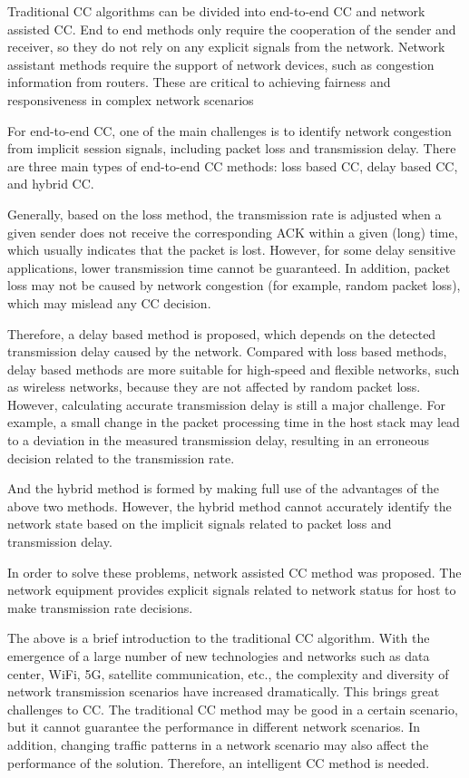 \documentclass[conference]{IEEEtran}
\begin{document}
Traditional CC algorithms can be divided into end-to-end CC and network assisted CC. End to end methods only require the cooperation of the sender and receiver, so they do not rely on any explicit signals from the network. Network assistant methods require the support of network devices, such as congestion information from routers. These are critical to achieving fairness and responsiveness in complex network scenarios

For end-to-end CC, one of the main challenges is to identify network congestion from implicit session signals, including packet loss and transmission delay. There are three main types of end-to-end CC methods: loss based CC, delay based CC, and hybrid CC.

Generally, based on the loss method, the transmission rate is adjusted when a given sender does not receive the corresponding ACK within a given (long) time, which usually indicates that the packet is lost. However, for some delay sensitive applications, lower transmission time cannot be guaranteed. In addition, packet loss may not be caused by network congestion (for example, random packet loss), which may mislead any CC decision.

Therefore, a delay based method is proposed, which depends on the detected transmission delay caused by the network. Compared with loss based methods, delay based methods are more suitable for high-speed and flexible networks, such as wireless networks, because they are not affected by random packet loss. However, calculating accurate transmission delay is still a major challenge. For example, a small change in the packet processing time in the host stack may lead to a deviation in the measured transmission delay, resulting in an erroneous decision related to the transmission rate. 

And the hybrid method is formed by making full use of the advantages of the above two methods. However, the hybrid method cannot accurately identify the network state based on the implicit signals related to packet loss and transmission delay.

In order to solve these problems, network assisted CC method was proposed. The network equipment provides explicit signals related to network status for host to make transmission rate decisions.

The above is a brief introduction to the traditional CC algorithm. With the emergence of a large number of new technologies and networks such as data center, WiFi, 5G, satellite communication, etc., the complexity and diversity of network transmission scenarios have increased dramatically. This brings great challenges to CC. The traditional CC method may be good in a certain scenario, but it cannot guarantee the performance in different network scenarios. In addition, changing traffic patterns in a network scenario may also affect the performance of the solution. Therefore, an intelligent CC method is needed.
\end{document}
